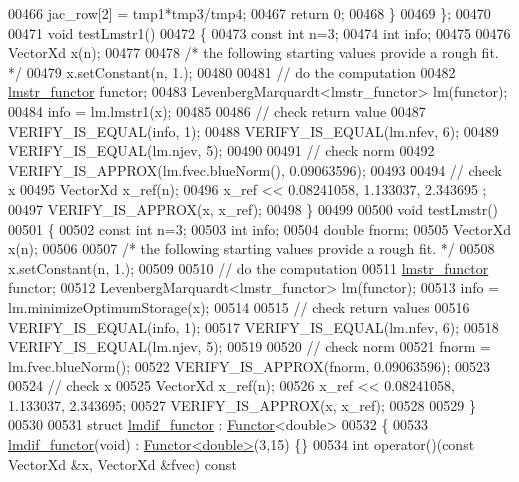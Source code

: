 \begin{DoxyCode}
00466         jac\_row[2] = tmp1*tmp3/tmp4;
00467         \textcolor{keywordflow}{return} 0;
00468     \}
00469 \};
00470 
00471 \textcolor{keywordtype}{void} testLmstr1()
00472 \{
00473   \textcolor{keyword}{const} \textcolor{keywordtype}{int} n=3;
00474   \textcolor{keywordtype}{int} info;
00475 
00476   VectorXd x(n);
00477 
00478   \textcolor{comment}{/* the following starting values provide a rough fit. */}
00479   x.setConstant(n, 1.);
00480 
00481   \textcolor{comment}{// do the computation}
00482   \hyperlink{structlmstr__functor}{lmstr\_functor} functor;
00483   LevenbergMarquardt<lmstr\_functor> lm(functor);
00484   info = lm.lmstr1(x);
00485 
00486   \textcolor{comment}{// check return value}
00487   VERIFY\_IS\_EQUAL(info, 1);
00488   VERIFY\_IS\_EQUAL(lm.nfev, 6);
00489   VERIFY\_IS\_EQUAL(lm.njev, 5);
00490 
00491   \textcolor{comment}{// check norm}
00492   VERIFY\_IS\_APPROX(lm.fvec.blueNorm(), 0.09063596);
00493 
00494   \textcolor{comment}{// check x}
00495   VectorXd x\_ref(n);
00496   x\_ref << 0.08241058, 1.133037, 2.343695 ;
00497   VERIFY\_IS\_APPROX(x, x\_ref);
00498 \}
00499 
00500 \textcolor{keywordtype}{void} testLmstr()
00501 \{
00502   \textcolor{keyword}{const} \textcolor{keywordtype}{int} n=3;
00503   \textcolor{keywordtype}{int} info;
00504   \textcolor{keywordtype}{double} fnorm;
00505   VectorXd x(n);
00506 
00507   \textcolor{comment}{/* the following starting values provide a rough fit. */}
00508   x.setConstant(n, 1.);
00509 
00510   \textcolor{comment}{// do the computation}
00511   \hyperlink{structlmstr__functor}{lmstr\_functor} functor;
00512   LevenbergMarquardt<lmstr\_functor> lm(functor);
00513   info = lm.minimizeOptimumStorage(x);
00514 
00515   \textcolor{comment}{// check return values}
00516   VERIFY\_IS\_EQUAL(info, 1);
00517   VERIFY\_IS\_EQUAL(lm.nfev, 6);
00518   VERIFY\_IS\_EQUAL(lm.njev, 5);
00519 
00520   \textcolor{comment}{// check norm}
00521   fnorm = lm.fvec.blueNorm();
00522   VERIFY\_IS\_APPROX(fnorm, 0.09063596);
00523 
00524   \textcolor{comment}{// check x}
00525   VectorXd x\_ref(n);
00526   x\_ref << 0.08241058, 1.133037, 2.343695;
00527   VERIFY\_IS\_APPROX(x, x\_ref);
00528 
00529 \}
00530 
00531 \textcolor{keyword}{struct }\hyperlink{structlmdif__functor}{lmdif\_functor} : \hyperlink{struct_functor}{Functor}<double>
00532 \{
00533     \hyperlink{structlmdif__functor}{lmdif\_functor}(\textcolor{keywordtype}{void}) : \hyperlink{struct_functor}{Functor<double>}(3,15) \{\}
00534     \textcolor{keywordtype}{int} operator()(\textcolor{keyword}{const} VectorXd &x, VectorXd &fvec)\textcolor{keyword}{ const}

\end{DoxyCode}
